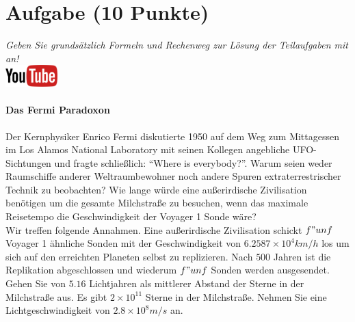 \documentclass[a4paper, 9pt]{scrartcl}\usepackage[]{graphicx}\usepackage[]{xcolor}
\begin{document}
\section{Aufgabe \hfill (10 Punkte)}

\textit{Geben Sie grunds{\"a}tzlich Formeln und Rechenweg zur L{\"o}sung der
  Teilaufgaben mit an!} \\[1Ex]

\hfill\href{https://youtu.be/iCQogS6KhPM}{\includegraphics[width =
  2cm]{img/youtube}} %
\hspace{2Ex}

\paragraph{Das Fermi Paradoxon}



Der Kernphysiker Enrico Fermi diskutierte 1950 auf dem Weg zum Mittagessen
im Los Alamos National Laboratory mit seinen Kollegen angebliche
UFO-Sichtungen und fragte schlie{\ss}lich: "`Where is everybody?"'. Warum seien
weder Raumschiffe anderer Weltraumbewohner noch andere Spuren
extraterrestrischer Technik zu beobachten? Wie lange w{\"u}rde eine au{\ss}erirdische
Zivilisation ben{\"o}tigen um die gesamte Milchstra{\ss}e zu
besuchen, wenn das maximale Reisetempo die Geschwindigkeit der Voyager 1 Sonde w{\"a}re?\\[-1ex]

Wir treffen folgende Annahmen. Eine au{\ss}erirdische Zivilisation schickt $f{"u}nf$
Voyager 1 {\"a}hnliche Sonden mit der Geschwindigkeit von $\ensuremath{6.2587\times 10^{4}}km/h$
los um sich auf den erreichten Planeten selbst zu replizieren. Nach
$500$ Jahren ist die Replikation abgeschlossen und wiederum
$f{"u}nf$ Sonden werden ausgesendet. Gehen Sie von
$5.16$ Lichtjahren als mittlerer Abstand der Sterne in der
Milchstra{\ss}e aus. Es gibt $\ensuremath{2\times 10^{11}}$ Sterne in der Milchstra{\ss}e. Nehmen
Sie eine Lichtgeschwindigkeit von $\ensuremath{2.8\times 10^{8}}m/s$ an.
\end{document}
